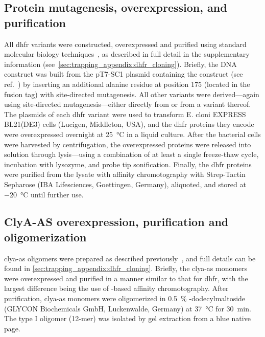 \subsection{Protein mutagenesis, overexpression, and purification}
%

All \gls{dhfr} variants were constructed, overexpressed and purified using standard molecular biology
techniques~\cite{Soskine-Biesemans-2015,Biesemans-2015}, as described in full detail in the supplementary
information (see~\cref{sec:trapping_appendix:dhfr_cloning}). Briefly, the  DNA construct was built
from the {pT7-SC1} plasmid containing the \DHFRt{} construct (see ref.~\cite{Soskine-Biesemans-2015}) by
inserting an additional alanine residue at position 175 (located in the fusion tag) with site-directed
mutagenesis. All other variants were derived---again using site-directed mutagenesis---either directly from
 or from a variant thereof. The plasmids of each \gls{dhfr} variant were used to transform E.
cloni\textsuperscript{\textregistered} EXPRESS BL21(DE3) cells (Lucigen, Middleton, USA), and the \gls{dhfr}
proteins they encode were overexpressed overnight at \SI{25}{\celsius} in a liquid culture. After the
bacterial cells were harvested by centrifugation, the overexpressed proteins were released into solution
through lysis---using a combination of at least a single freeze-thaw cycle, incubation with lysozyme, and
probe tip sonification. Finally, the \gls{dhfr} proteins were purified from the lysate with affinity
chromotography with Strep-Tactin\textsuperscript{\textregistered} Sepharose\textsuperscript{\textregistered}
(IBA Lifesciences, Goettingen, Germany), aliquoted, and stored at \SI{-20}{\celsius} until further use.


\subsection{ClyA-AS overexpression, purification and oligomerization}
%

\gls{clya-as} oligomers were prepared as described previously~\cite{Soskine-2013}, and full details can be
found in \cref{sec:trapping_appendix:dhfr_cloning}. Briefly, the \gls{clya-as} monomers were overexpressed and
purified in a manner similar to that for \gls{dhfr}, with the largest difference being the use of
-based affinity chromotography. After purification, \gls{clya-as} monomers were oligomerized in
\SI{0.5}{\percent} \textbeta-dodecylmaltoside (GLYCON Biochemicals GmbH, Luckenwalde, Germany) at
\SI{37}{\celsius} for \SI{30}{\minute}. The type I oligomer (12-mer) was isolated by gel extraction from a
blue native \gls{page}.


